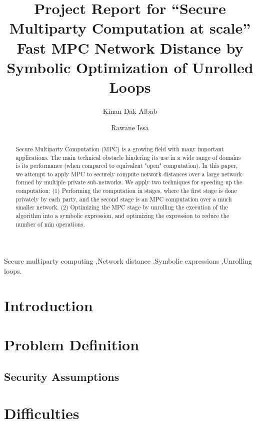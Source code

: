 \documentclass[final,3p,times,12pt]{elsarticle}
\begin{document}
\begin{frontmatter}

\title{Project Report for ``Secure Multiparty Computation at scale'' \\
Fast MPC Network Distance by Symbolic Optimization of Unrolled Loops}

\author[kbab]{Kinan Dak Albab}
\author[ra1issa]{Rawane Issa}
\address[kbab]{Boston University}
\address[ra1issa]{Boston University}


\begin{abstract}
Secure Multiparty Computation (MPC) is a growing field with many important applications. The main technical obstacle hindering its use in a wide range of domains is its performance (when compared to equivalent "open" computation). In this paper, we attempt to apply MPC to securely compute network distances over a large network formed by multiple private sub-networks. We apply two techniques for speeding up the computation: (1) Performing the computation in stages, where the first stage is done privately by each party, and the second stage is an MPC computation over a much smaller network. (2) Optimizing the MPC stage by unrolling the execution of the algorithm into a symbolic expression, and optimizing the expression to reduce the number of min operations. 
\end{abstract}

\begin{keyword}
Secure multiparty computing \sep Network distance \sep Symbolic expressions \sep Unrolling loops.
\end{keyword}

\end{frontmatter}

\section{Introduction}


\section{Problem Definition}


\subsection{Security Assumptions}


\section{Difficulties}

\end{document}

